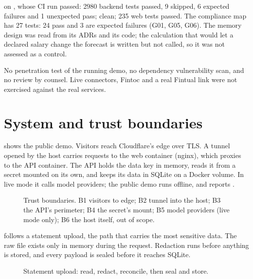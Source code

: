 \documentclass[11pt,a4paper]{article}
\begin{document}
\begin{description}[style=nextline,leftmargin=1.2em]
    \texttt{\nlCommit} on \texttt{\nlBranch}, whose CI run passed: 2980 backend tests passed, 9 skipped, 6 expected
    failures and 1 unexpected pass;  clean; 235 web tests passed. The compliance map has 27 tests: 24 pass
    and 3 are expected failures (G01, G05, G06). The memory design was read from its ADRs and its code; the
    calculation that would let a declared salary change the forecast is written but not called, so it was not assessed
    as a control.
  \item[Limits] No penetration test of the running demo, no dependency vulnerability scan, and no review by counsel.
    Live connectors, Fintoc and a real Fintual link were not exercised against the real services.
\end{description}

\section{System and trust boundaries}\label{sec:system}

 shows the public demo. Visitors reach Cloudflare's edge over TLS. A tunnel opened by the host carries
requests to the web container (nginx), which proxies  to the API container. The API holds the data key in
memory, reads it from a secret mounted on its own, and keeps its data in SQLite on a Docker volume. In live mode it calls
model providers; the public demo runs offline, and  reports .

\begin{figure}[htbp]
  \centering
  
  \caption{Trust boundaries. B1 visitors to edge; B2 tunnel into the host; B3 the API's perimeter; B4 the secret's mount;
  B5 model providers (live mode only); B6 the host itself, out of scope.}\label{fig:trust}
\end{figure}

 follows a statement upload, the path that carries the most sensitive data. The raw file exists
only in memory during the request. Redaction runs before anything is stored, and every payload is sealed before it
reaches SQLite.

\begin{figure}[htbp]
  \centering
  
  \caption{Statement upload: read, redact, reconcile, then seal and store.}\label{fig:dataflow}
\end{figure}
\end{document}
